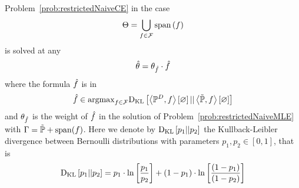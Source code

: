 \begin{theorem}
	Problem~\ref{prob:restrictedNaiveCE} in the case 
	\begin{align*}
		\Theta = \bigcup_{f\in\mathcal{F}} \mathrm{span}\left(f\right) 
	\end{align*}
	is solved at any
	\begin{align*}
		\hat{\theta} = \theta_{\hat{f}} \cdot \hat{f}
	\end{align*}
	where the formula $\hat{f}$ is in
	\begin{align*}
		\hat{f} \in \mathrm{argmax}_{f\in\mathcal{F}} \mathrm{D}_{\mathrm{KL}}\left[ \left\langle \mathbb{P}^{D},f\right\rangle \left[ \varnothing \right] || \left\langle \tilde{\mathbb{P}},f\right\rangle \left[ \varnothing \right] \right]
	\end{align*}
	and $\theta_{\hat{f}}$ is the weight of $\hat{f}$ in the solution of Problem~\ref{prob:restrictedNaiveMLE} with $\Gamma = \tilde{\mathbb{P}} + \mathrm{span}(f)$.
	Here we denote by $\mathrm{D}_{\mathrm{KL}}\left[ p_1 || p_2 \right]$ the Kullback-Leibler divergence between Bernoulli distributions with parameters $p_1,p_2\in[0,1]$, that is
		\[ \mathrm{D}_{\mathrm{KL}}\left[ p_1 || p_2 \right] = p_1 \cdot \ln \left[ \frac{p_1}{p_2} \right] + (1-p_1) \cdot \ln \left[ \frac{(1-p_1)}{(1-p_2)} \right]  \]
\end{theorem}	
